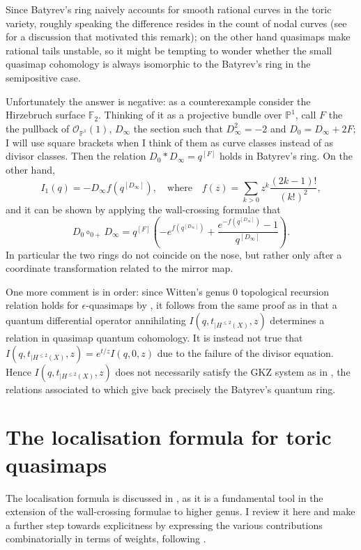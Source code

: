 \documentclass[11pt]{amsart}
\newcommand{\PP}{\mathbb P}
\newcommand{\OO}{\mathcal{O}}
\theoremstyle{definition}
\theoremstyle{definition}
\begin{document}
Since Batyrev's ring naively accounts for smooth rational curves in the toric variety, roughly speaking the difference resides in the count of nodal curves (see \cite{HScounting} for a discussion that motivated this remark); on the other hand quasimaps make rational tails unstable, so it might be tempting to wonder whether the small quasimap cohomology is always isomorphic to the Batyrev's ring in the semipositive case.

Unfortunately the answer is negative: as a counterexample consider the Hirzebruch surface $\mathbb F_2$. Thinking of it as a projective bundle over $\PP^1$, call $F$ the the pullback of $\OO_{\PP^1}(1)$, $D_\infty$ the section such that $D_\infty^2=-2$ and $D_0=D_\infty+2F$; I will use square brackets when I think of them as curve classes instead of as divisor classes. Then the relation $D_0*D_\infty=q^{[F]}$ holds in Batyrev's ring. On the other hand, \[I_1(q)=-D_\infty f(q^{[D_\infty]}), \quad \text{where}\quad f(z)=\sum_{k>0}z^k \frac{(2k-1)!}{(k!)^2},\] and it can be shown by applying the wall-crossing formulae that
\[ D_0\circ_{0+}D_\infty=q^{[F]}\left(-e^{f(q^{[D_\infty]})}+\frac{e^{-f(q^{[D_\infty]})}-1}{q^{[D_\infty]}}\right).\]
In particular the two rings do not coincide on the nose, but rather only after a coordinate transformation related to the mirror map.

One more comment is in order: since Witten's genus $0$ topological recursion relation holds for $\epsilon$-quasimaps by \cite[Corollary 2.3.4]{CF-K-higher-genus}, it follows from the same proof as in \cite[Theorem 10.3.1]{MS} that a quantum differential operator annihilating $I(q,t_{|H^{\leq 2}(X)},z)$ determines a relation in quasimap quantum cohomology. It is instead not true that $I(q,t_{|H^{\leq 2}(X)},z)=e^{t/z}I(q,0,z)$ due to the failure of the divisor equation. Hence $I(q,t_{|H^{\leq 2}(X)},z)$ does not necessarily satisfy the GKZ system as in \cite[\S 5.5.3]{MS}, the relations associated to which give back precisely the Batyrev's quantum ring.

\section{The localisation formula for toric quasimaps}
The localisation formula is discussed in \cite[\S 5]{CF-K-higher-genus}, as it is a fundamental tool in the extension of the wall-crossing formulae to higher genus. I review it here and make a further step towards explicitness by expressing the various contributions combinatorially in terms of weights, following \cite{HolgerSpielberg}.
\end{document}
